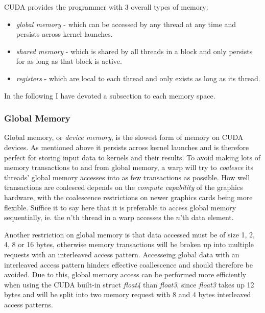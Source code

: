 CUDA provides the programmer with 3 overall types of memory:

\begin{itemize}
\item \textit{global memory} - which can be accessed by any thread at any
  time and persists across kernel launches. 
\item \textit{shared memory} - which is shared by all threads in a
  block and only persists for as long as that block is active.
\item \textit{registers} - which are local to each thread and only exists
  as long as its thread. 
\end{itemize}

In the following I have devoted a subsection to each memory space.

\subsubsection{Global Memory}


Global memory, or \textit{device memory}, is the slowest form of
memory on CUDA devices. As mentioned above it persists across kernel
launches and is therefore perfect for storing input data to kernels
and their results. To avoid making lots of memory transactions to and
from global memory, a warp will try to \textit{coalesce} its threads'
global memory accesses into as few transactions as possible. How well
transactions are coalesced depends on the \textit{compute capability}
of the graphics hardware, with the coalescence restrictions on newer
graphics cards being more flexible. Suffice it to say here that it is
preferable to access global memory sequentially, ie. the $n$'th thread
in a warp accesses the $n$'th data element.


Another restriction on global memory is that data accessed must be of
size 1, 2, 4, 8 or 16 bytes, otherwise memory transactions will be
broken up into multiple requests with an interleaved access
pattern. Accesseing global data with an interleaved access pattern
hinders effective coallescence and should therefore be avoided. Due to
this, global memory access can be performed more efficiently when
using the CUDA built-in struct \textit{float4} than \textit{float3},
since \textit{float3} takes up 12 bytes and will be split into two
memory request with 8 and 4 bytes interleaved access patterns.

